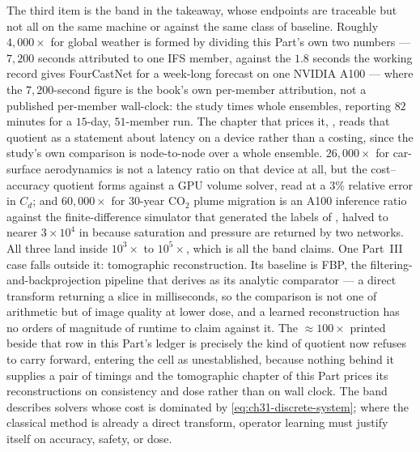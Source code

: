 The third item is the band in the takeaway, whose endpoints are traceable but not all on the same
machine or against the same class of baseline. Roughly $4{,}000\times$ for global weather
\cite{pathak2022fourcastnet} is formed by dividing this Part's own two numbers --- $7{,}200$
seconds attributed to one IFS member, against the $1.8$ seconds the working record gives FourCastNet for a
week-long forecast on one NVIDIA A100 --- where the $7{,}200$-second figure is the book's own
per-member attribution, not a published per-member wall-clock: the study times whole ensembles,
reporting $82$ minutes for a $15$-day, $51$-member run. The chapter that prices it,
, reads that quotient as a
statement about latency on a device rather than a costing, since the study's own comparison
is node-to-node over a whole ensemble. $26{,}000\times$ for car-surface aerodynamics is not a
latency ratio on that device at all, but the cost--accuracy quotient \cite{li2023geometry} forms
against a GPU volume solver, read at a $3\%$ relative error in $C_d$; and $60{,}000\times$ for
30-year $\mathrm{CO}_{2}$ plume migration is an A100 inference ratio against the finite-difference
simulator that generated the labels of \cite{wen2022ufno}, halved to nearer $3\times10^{4}$ in
 because saturation and pressure are
returned by two networks. All three land inside $10^{3}\times$ to $10^{5}\times$, which is all the
band claims. One Part~III case falls outside it: tomographic reconstruction. Its baseline is FBP,
the filtering-and-backprojection pipeline that
 derives as its analytic comparator ---
a direct transform returning a slice in milliseconds, so the comparison is not one of arithmetic but
of image quality at lower dose, and a learned reconstruction has no orders of magnitude of runtime
to claim against it. The $\approx 100\times$ printed beside that row in this Part's
ledger is precisely
the kind of quotient  now refuses to
carry forward, entering the cell as unestablished, because nothing behind it supplies a pair of
timings and the tomographic chapter of this Part prices its reconstructions on consistency and
dose rather than on wall clock. The band describes solvers whose cost is dominated
by \eqref{eq:ch31-discrete-system}; where the classical method is already a direct transform,
operator learning must justify itself on accuracy, safety, or dose.

